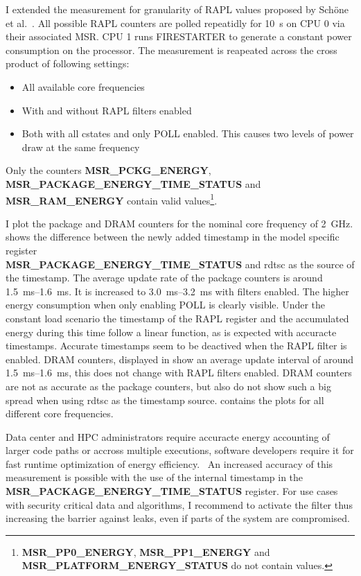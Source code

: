 I extended the measurement for granularity of RAPL values proposed by Schöne et al.~\cite{Schoene_2024_Alder_Lake}.
All possible RAPL counters are polled repeatidly for \SI{10}{\s} on CPU 0 via their associated MSR.
CPU 1 runs FIRESTARTER to generate a constant power consumption on the processor.
The measurement is reapeated across the cross product of following settings:
\begin{itemize}
    \item All available core frequencies
    \item With and without RAPL filters enabled
    \item Both with all cstates and only POLL enabled.
    This causes two levels of power draw at the same frequency
\end{itemize}
Only the counters \textbf{MSR\_PCKG\_ENERGY}, \textbf{MSR\_PACKAGE\_ENERGY\_TIME\_STATUS} and\\ \textbf{MSR\_RAM\_ENERGY} contain valid values\footnote{\textbf{MSR\_PP0\_ENERGY}, \textbf{MSR\_PP1\_ENERGY} and \textbf{MSR\_PLATFORM\_ENERGY\_STATUS} do not contain values.}.

I plot the package and DRAM counters for the nominal core frequency of \SI{2}{\GHz}.
 shows the difference between the newly added timestamp in the model specific register\\ \textbf{MSR\_PACKAGE\_ENERGY\_TIME\_STATUS} and rdtsc as the source of the timestamp.
The average update rate of the package counters is around \SI{1.5}{\ms}--\SI{1.6}{\ms}.
It is increased to \SI{3.0}{\ms}--\SI{3.2}{\ms} with filters enabled.
The higher energy consumption when only enabling POLL is clearly visible.
Under the constant load scenario the timestamp of the RAPL register and the accumulated energy during this time follow a linear function, as is expected with accuracte timestamps.
Accurate timestamps seem to be deactived when the RAPL filter is enabled.
DRAM counters, displayed in  show an average update interval of around \SI{1.5}{\ms}--\SI{1.6}{\ms}, this does not change with RAPL filters enabled.
DRAM counters are not as accurate as the package counters, but also do not show such a big spread when using rdtsc as the timestamp source.
 contains the plots for all different core frequencies.

Data center and HPC administrators require accuracte energy accounting of larger code paths or accross multiple executions, software developers require it for fast runtime optimization of energy efficiency.~\cite{Gocht_2019_QLearning,Haehnel_2012_RAPL}
An increased accuracy of this measurement is possible with the use of the internal timestamp in the \textbf{MSR\_PACKAGE\_ENERGY\_TIME\_STATUS} register.
For use cases with security critical data and algorithms, I recommend to activate the filter thus increasing the barrier against leaks, even if parts of the system are compromised.

